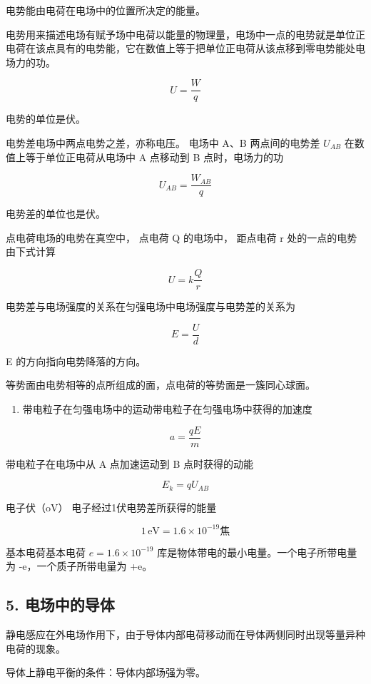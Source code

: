 电势能由电荷在电场中的位置所决定的能量。

电势用来描述电场有赋予场中电荷以能量的物理量，电场中一点的电势就是单位正电荷在该点具有的电势能，它在数值上等于把单位正电荷从该点移到零电势能处电场力的功。

\[
U = \frac{W}{q}
\]

电势的单位是伏。

电势差电场中两点电势之差，亦称电压。 电场中 A、B 两点间的电势差
\(U_{AB}\) 在数值上等于单位正电荷从电场中 A 点移动到 B 点时，电场力的功

\[
U_{A B} = \frac{W_{A B}}{q}
\]

电势差的单位也是伏。

点电荷电场的电势在真空中， 点电荷 Q 的电场中， 距点电荷 r
处的一点的电势由下式计算

\[
U = k \frac{Q}{r}
\]

电势差与电场强度的关系在匀强电场中电场强度与电势差的关系为

\[
E = \frac{U}{d}
\]

E 的方向指向电势降落的方向。

等势面由电势相等的点所组成的面，点电荷的等势面是一簇同心球面。

\begin{enumerate}
\def\labelenumi{\arabic{enumi}.}
\setcounter{enumi}{3}
\tightlist
\item
  带电粒子在匀强电场中的运动带电粒子在匀强电场中获得的加速度
\end{enumerate}

\[
a = \frac{q E}{m}
\]

带电粒子在电场中从 A 点加速运动到 B 点时获得的动能

\[
E_{k} = q U_{A B}
\]

电子伏（oV） 电子经过1伏电势差所获得的能量

\[
1\,\mathrm{eV}=1.6\times10^{-19} \text{焦}
\]

基本电荷基本电荷 \(e=1.6\times10^{-19}\)
库是物体带电的最小电量。一个电子所带电量为 -e，一个质子所带电量为 +e。

\subsection{5.
电场中的导体}\label{ux7535ux573aux4e2dux7684ux5bfcux4f53-1}

静电感应在外电场作用下，由于导体内部电荷移动而在导体两侧同时出现等量异种电荷的现象。

导体上静电平衡的条件：导体内部场强为零。

